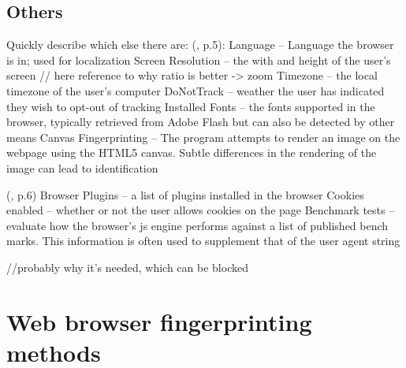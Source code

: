 \subsection{Others}
Quickly describe which else there are:
(\textcite{havens16}, p.5):
Language – Language the browser is in; used for localization
Screen Resolution – the with and height of the user’s screen
// here reference to why ratio is better -> zoom
Timezone – the local timezone of the user’s computer
DoNotTrack – weather the user has indicated they wish to opt-out of tracking
Installed Fonts – the fonts supported in the browser, typically retrieved from Adobe Flash but can also be detected by other means
Canvas Fingerprinting – The program attempts to render an image on the webpage using the HTML5 canvas. Subtle differences in the rendering of the image can lead to identification

(\textcite{havens16}, p.6)
Browser Plugins – a list of plugins installed in the browser
Cookies enabled – whether or not the user allows cookies on the page
Benchmark tests – evaluate how the browser’s js engine performs against a list of published bench marks. This information is often used to supplement that of the user agent string

//probably why it's needed, which can be blocked


\newpage
\section{Web browser fingerprinting methods}\label{sec:Methods}
